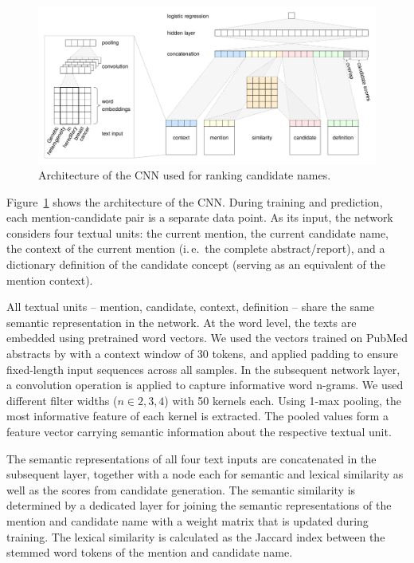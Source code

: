 \documentclass{bioinfo}
\newcommand{\ie}{i.\,e.\ }
\begin{document}
\begin{figure}[!tpb]
\centerline{\includegraphics[width=\textwidth]{img/nn-arch.pdf}}
\caption{Architecture of the CNN used for ranking candidate names.}\label{fig:sys-arch}
\end{figure}

Figure~\ref{fig:sys-arch} shows the architecture of the CNN.
During training and prediction, each mention-candidate pair is a separate data point.
As its input, the network considers four textual units:
the current mention, the current candidate name, the context of the current mention (\ie the complete abstract/report), and a dictionary definition of the candidate concept (serving as an equivalent of the mention context).

All textual units -- mention, candidate, context, definition -- share the same semantic representation in the network.
At the word level, the texts are embedded using pretrained word vectors.
We used the vectors trained on PubMed abstracts by \cite{chiu-et-al:2016:BioNLP} with a context window of 30 tokens,  %
and applied padding to ensure fixed-length input sequences across all samples.
In the subsequent network layer, a convolution operation is applied to capture informative word n-grams.
We used different filter widths ($n \in {2,3,4}$) with 50 kernels each.
Using 1-max pooling, the most informative feature of each kernel is extracted.
The pooled values form a feature vector carrying semantic information about the respective textual unit.

The semantic representations of all four text inputs are concatenated in the subsequent layer, together with a node each for semantic and lexical similarity as well as the scores from candidate generation.
The semantic similarity is determined by a dedicated layer for joining the semantic representations of the mention and candidate name with a weight matrix that is updated during training.
The lexical similarity is calculated as the Jaccard index  %
between the stemmed word tokens \citep{porter:1980} of the mention and candidate name.
\end{document}
